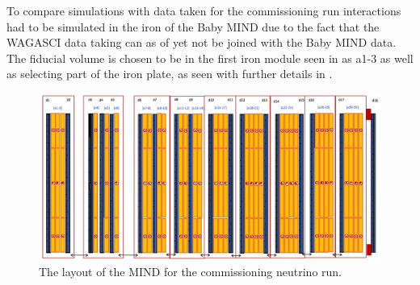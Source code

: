 
To compare simulations with data taken for the commissioning run interactions had to be simulated in the iron of the Baby MIND due to the fact that the WAGASCI data taking can as of yet not be joined with the Baby MIND data. The fiducial volume is chosen to be in the first iron module seen in  as a1-3 as well as selecting part of the iron plate, as seen with further details in . 

\begin{figure}
\centering
\includegraphics[width=\textwidth]{figures/NeutrinoChap/NuFactTalk/Layout300118.jpeg}
\caption{The layout of the MIND for the commissioning neutrino run.}
\label{fig:MINDneutrinoLayout}
\end{figure}

